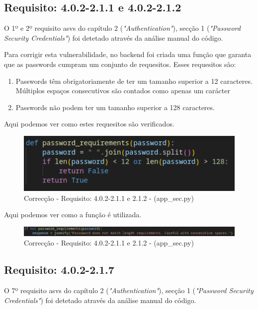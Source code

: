 \subsection*{Requisito: 4.0.2-2.1.1 e 4.0.2-2.1.2}
O 1º e 2º requisito \ac{asvs} do capítulo 2 (\textit{"Authentication"}), secção 1  (\textit{"Password Security Credentials"}) foi detetado através da análise manual do código.

Para corrigir esta vulnerabilidade, no backend foi criada uma função que garanta que as passwords cumpram um conjunto de  requesitos. Esses requesitos são:

\begin{enumerate}
    \item Passwords têm obrigatoriamente de ter um tamanho superior a 12 caracteres. Múltiplos espaços consecutivos são contados como apenas um carácter
    \item Passwords não podem ter um tamanho superior a 128 caracteres.
\end{enumerate}

Aqui podemos ver como estes requesitos são verificados.

\begin{figure}[H]
      \centering
      \includegraphics[width=14cm]{images/pass_req.png}
      \caption{Correcção - Requisito: 4.0.2-2.1.1 e 2.1.2 - (app\_sec.py)}
      \label{fig:pass_req}
\end{figure}

Aqui podemos ver como a função é utilizada.

\begin{figure}[H]
      \centering
      \includegraphics[width=14cm]{images/use_pass_req.png}
      \caption{Correcção - Requisito: 4.0.2-2.1.1 e 2.1.2 - (app\_sec.py)}
      \label{fig:use pass_req}
\end{figure}


\subsection*{Requisito: 4.0.2-2.1.7}
O 7º requisito \ac{asvs} do capítulo 2 (\textit{"Authentication"}), secção 1  (\textit{"Password Security Credentials"}) foi detetado através da análise manual do código.

